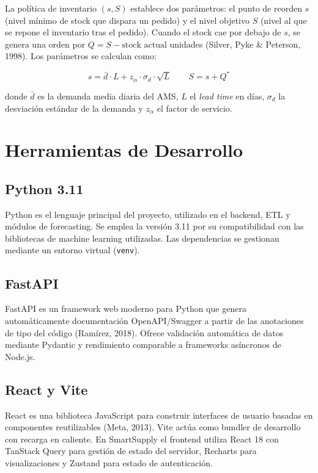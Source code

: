 \documentclass[12pt, a4paper]{report}
\begin{document}
La política de inventario $(s,S)$ establece dos parámetros: el punto de reorden $s$ (nivel
mínimo de stock que dispara un pedido) y el nivel objetivo $S$ (nivel al que se repone
el inventario tras el pedido). Cuando el stock cae por debajo de $s$, se genera una
orden por $Q = S - \text{stock actual}$ unidades (Silver, Pyke \& Peterson, 1998).
Los parámetros se calculan como:

\[
  s = \bar{d} \cdot L + z_\alpha \cdot \sigma_d \cdot \sqrt{L}
  \qquad
  S = s + Q^*
\]

donde $\bar{d}$ es la demanda media diaria del AMS, $L$ el \textit{lead time} en días,
$\sigma_d$ la desviación estándar de la demanda y $z_\alpha$ el factor de servicio.

\section{Herramientas de Desarrollo}

\subsection{Python 3.11}

Python es el lenguaje principal del proyecto, utilizado en el backend, ETL y módulos
de forecasting. Se emplea la versión 3.11 por su compatibilidad con las bibliotecas
de machine learning utilizadas. Las dependencias se gestionan mediante un entorno
virtual (\texttt{venv}).

\subsection{FastAPI}

FastAPI es un framework web moderno para Python que genera automáticamente
documentación OpenAPI/Swagger a partir de las anotaciones de tipo del código
(Ramírez, 2018). Ofrece validación automática de datos mediante Pydantic y rendimiento
comparable a frameworks asíncronos de Node.js.

\subsection{React y Vite}

React es una biblioteca JavaScript para construir interfaces de usuario basadas en
componentes reutilizables (Meta, 2013). Vite actúa como bundler de desarrollo con
recarga en caliente. En SmartSupply el frontend utiliza React 18 con TanStack Query
para gestión de estado del servidor, Recharts para visualizaciones y Zustand para
estado de autenticación.
\end{document}
